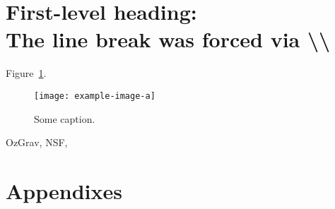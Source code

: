 \documentclass[%
 reprint,
 amsmath,amssymb,
 aps,
]{revtex4-2}
\begin{document}
\begin{abstract}
Gravitational wave astronomy has been firmly established with the detection of gravitational waves from the merger of ten stellar mass binary black holes and a neutron star binary. This paper reports on the all-sky search for gravitational waves from intermediate mass black hole binaries in the first and second observing runs of the Advanced LIGO and Virgo network. The search uses three independent algorithms: two based on matched filtering of the data with waveform templates of gravitational wave signals from compact binaries, and a third, model-independent algorithm that employs no signal model for the incoming signal. No intermediate mass black hole binary event was detected in this search. Consequently, we place upper limits on the merger rate density for a family of intermediate mass black hole binaries. In particular, we choose sources with total masses M=m1+m2∈[120,800]M⊙ and mass ratios q=m2/m1∈[0.1,1.0]. For the first time, this calculation is done using numerical relativity waveforms (which include higher modes) as models of the real emitted signal. We place a most stringent upper limit of 0.20~Gpc−3yr−1 (in co-moving units at the 90\% confidence level) for equal-mass binaries with individual masses m1,2=100M⊙ and dimensionless spins χ1,2=0.8 aligned with the orbital angular momentum of the binary. This improves by a factor of ∼5 that reported after Advanced LIGO's first observing run.

\end{abstract}

\maketitle



\section{\label{sec:level1}First-level heading:\protect\\ The line
break was forced \lowercase{via} \textbackslash\textbackslash}
\lipsum[1-2]
Figure~\ref{fig:distance-prior-comparison}.

\begin{figure}
    \centering
    \texttt{[image: example-image-a]}
    \caption{Some caption.}
    \label{fig:distance-prior-comparison}
\end{figure}

\begin{acknowledgments}
OzGrav, NSF, \lipsum[2-3]

\end{acknowledgments}

\appendix
\section{Appendixes}
\lipsum[8-9]


\end{document}
